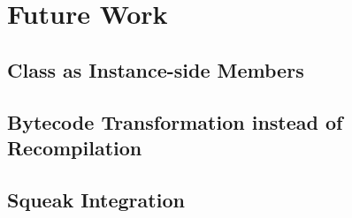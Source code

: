 \chapter{Future Work}

\section{Class as Instance-side Members}
\label{sec:future_inst_side}

\section{Bytecode Transformation instead of Recompilation}

\section{Squeak Integration}
